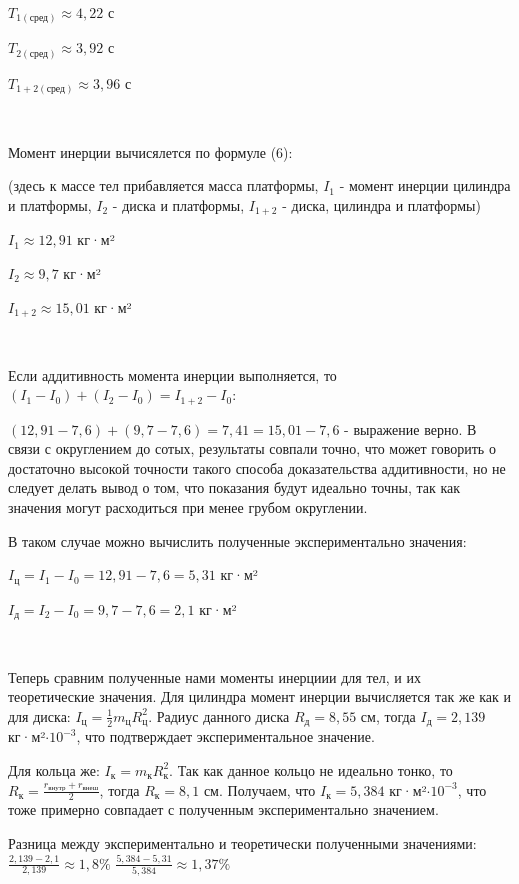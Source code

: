 \documentclass{article}
\begin{document}
\

\noindent
$T_{1(\text{сред})} \approx 4,22$ с

\noindent
$T_{2(\text{сред})} \approx 3,92$ с

\noindent
$T_{1+2(\text{сред})} \approx 3,96$ с

\

\noindent
Момент инерции вычисялется по формуле (6):

\noindent
(здесь к массе тел прибавляется масса платформы, $I_{1}$ - момент инерции цилиндра и платформы,  $I_{2}$ - диска и платформы, $I_{1+2}$ - диска, цилиндра и платформы)

\noindent
$I_{1} \approx 12,91$ кг·м²

\noindent
$I_{2} \approx 9,7$ кг·м²

\noindent
$I_{1+2} \approx 15,01$ кг·м²

\

\noindent
Если аддитивность момента инерции выполняется, то $(I_1-I_0) + (I_2-I_0) = I_{1+2}-I_0$:

\noindent
$(12,91-7,6) + (9,7-7,6) = 7,41 = 15,01-7,6$ - выражение верно. В связи с округлением до сотых, результаты совпали точно, что может говорить о достаточно высокой точности такого способа доказательства аддитивности, но не следует делать вывод о том, что показания будут идеально точны, так как значения могут расходиться при менее грубом округлении. 

\noindent
В таком случае можно вычислить полученные экспериментально значения:

$I_\text{ц} = I_1-I_0 = 12,91 - 7,6 = 5,31$ кг·м²

$I_\text{д} = I_2-I_0 = 9,7 - 7,6 = 2,1$ кг·м²

\

\noindent
Теперь сравним полученные нами моменты инерциии для тел, и их теоретические значения. Для цилиндра момент инерции вычисляется так же как и для диска: $I_\text{ц} = \frac{1}{2}m_\text{ц}R_\text{ц}^2$. Радиус данного диска $R_\text{д} = 8,55$ см, тогда $I_\text{д} = 2,139$ кг·м²$\cdot 10^{-3}$, что подтверждает экспериментальное значение.

\noindent    
Для кольца же: $I_\text{к} = m_\text{к}R_\text{к}^2$. Так как данное кольцо не идеально тонко, то $R_\text{к} = \frac{r_\text{внутр} + r_\text{внеш}}{2}$, тогда $R_\text{к} = 8,1 \text{ см}$. Получаем, что $I_\text{к} = 5,384$ кг·м²$\cdot 10^{-3}$, что тоже примерно совпадает с полученным экспериментально значением.

\noindent
Разница между экспериментально и теоретически полученными значениями: $\frac{2,139-2,1}{2,139} \approx 1,8\%$ $\frac{5,384-5,31}{5,384} \approx 1,37\%$
\end{document}
